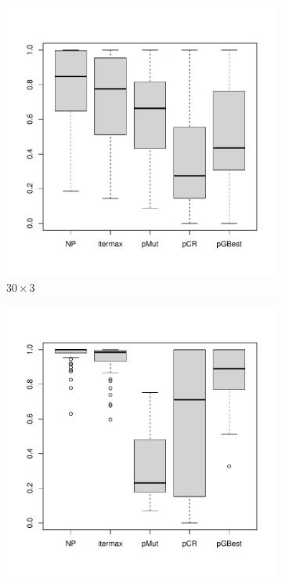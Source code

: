 \documentclass [PhD] {package/uclathes}
\begin{document}
\begin{figure}%
\centering
\begin{subfigure}[b]{0.3\textwidth}
\centering
\includegraphics{chapters/RSO/pdfs/corplot30}
\caption{$30\times 3$}
\end{subfigure}
\begin{subfigure}[b]{0.3\textwidth}
\centering
\includegraphics{chapters/RSO/pdfs/corplot50}

\end{subfigure}
\end{figure}
\end{document}
